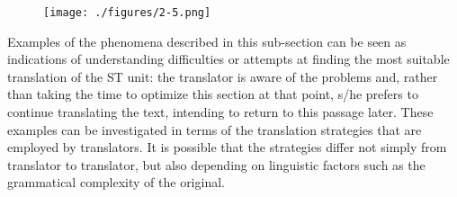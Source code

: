 \documentclass[output=paper]{LSP/langsci}
\begin{document}
\begin{figure}
\texttt{[image: ./figures/2-5.png]}
\end{figure}


Examples of the phenomena described in this sub-section can be seen as indications of understanding difficulties or attempts at finding the most suitable translation of the ST unit: the translator is aware of the problems and, rather than taking the time to optimize this section at that point, s/he prefers to continue translating the text, intending to return to this passage later. These examples can be investigated in terms of the translation strategies that are employed by translators. It is possible that the strategies differ not simply from translator to translator, but also depending on linguistic factors such as the grammatical complexity of the original.
\end{document}
